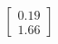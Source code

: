 \documentclass[preview]{standalone}
\begin{document}
\begin{align*}
\begin{bmatrix} 0.19 \\ 1.66 \end{bmatrix}
\end{align*}
\end{document}
